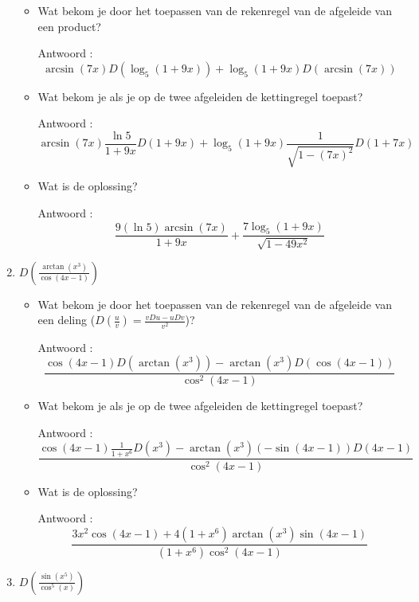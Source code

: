 \begin{enumerate}
\begin{itemize}
		\item Wat bekom je door het toepassen van de rekenregel van de afgeleide van een product?
		
		Antwoord : \[\arcsin (7x)D \left( \log_5(1+9x)  \right)+\log_5(1+9x)D \left(  \arcsin(7x)  \right)\]
		
		\item Wat bekom je als je op de twee afgeleiden de kettingregel toepast?
		
		Antwoord :  \[\arcsin (7x)\frac{\ln 5}{1+9x}D(1+9x)+\log_5(1+9x)\frac{1}{\sqrt{1-(7x)^2}}D(1+7x)\]
		
		\item Wat is de oplossing?
		
		Antwoord : \[\frac{9 \left( \ln 5  \right)\arcsin (7x)}{1+9x}+\frac{7\log_5(1+9x)}{\sqrt{1-49x^2}}\]
		
	\end{itemize}
	
	\item $D \left( \frac{\arctan \left( x^3  \right)}{\cos (4x-1)}  \right)$
	
	\begin{itemize}
		
		\item Wat bekom je door het toepassen van de rekenregel van de afgeleide van een deling ($D \left(  \frac{u}{v} \right)=\frac {vDu-uDv}{v^2}$)?
		
		Antwoord : \[\frac {\cos (4x-1) D \left(  \arctan \left( x^3 \right)  \right)-\arctan \left( x^3 \right)D\left( \cos (4x-1)  \right)}{\cos ^2(4x-1)}\]
		
		\item Wat bekom je als je op de twee afgeleiden de kettingregel toepast?
		
		Antwoord : \[\frac {\cos (4x-1) \frac{1}{1+x^6}D\left( x^3 \right)-\arctan \left( x^3 \right)\left(- \sin (4x-1)  \right)D(4x-1)}{\cos ^2(4x-1)}\]
		
		\item Wat is de oplossing?
		
		Antwoord : \[\frac {3x^2\cos (4x-1) +4(1+x^6)\arctan \left( x^3 \right) \sin (4x-1)}{(1+x^6)\cos ^2(4x-1)}\]
		
	\end{itemize}
	
	\item $D \left(  \frac{\sin \left( x^5  \right)}{\cos ^5 (x)}  \right)$
	
	\begin{itemize}
		

\end{itemize}
\end{enumerate}
